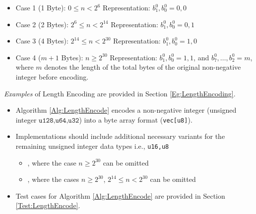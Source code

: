 \documentclass[../alan-handbook.tex]{subfiles}
\begin{document}
\begin{itemize}
    \item Case 1 (1 Byte): $0 \leq n < 2^6$ Representation: $b_1^0, b_0^0 = 0, 0$
    \item Case 2 (2 Bytes): $2^6 \leq n < 2^{14}$ Representation: $b_1^0, b_0^0 = 0, 1$
    \item Case 3 (4 Bytes): $2^{14} \leq n < 2^{30}$ Representation: $b_1^0, b_0^0 = 1, 0$
    \item Case 4 ($m+1$ Bytes): $n \geq 2^{30}$ Representation: $b_1^0, b_0^0 = 1, 1$, and $b_7^0, \ldots, b_2^0 = m$, where $m$ denotes the length of the total bytes of the original non-negative integer before encoding.
\end{itemize}

\textit{Examples} of Length Encoding are provided in Section \ref{Eg:LengthEncoding}.

\label{LengthEncode}

\begin{itemize}
    \item Algorithm \ref{Alg:LengthEncode} encodes a non-negative integer (unsigned integer $\texttt{u128,u64,u32}$) into a byte array format (\texttt{vec[u8]}). 
    \item Implementations should include additional necessary variants for the remaining unsigned integer data types i.e., \texttt{u16,u8}
    \begin{itemize}
        \item {} , where the case $n \geq 2^{30}$ can be omitted
        \item {} , where the cases $n \geq 2^{30}$, $2^{14} \leq n < 2^{30}$ can be omitted
    \end{itemize}
    \item Test cases for Algorithm \ref{Alg:LengthEncode} are provided in Section \ref{Test:LengthEncode}.
\end{itemize}
\end{document}
